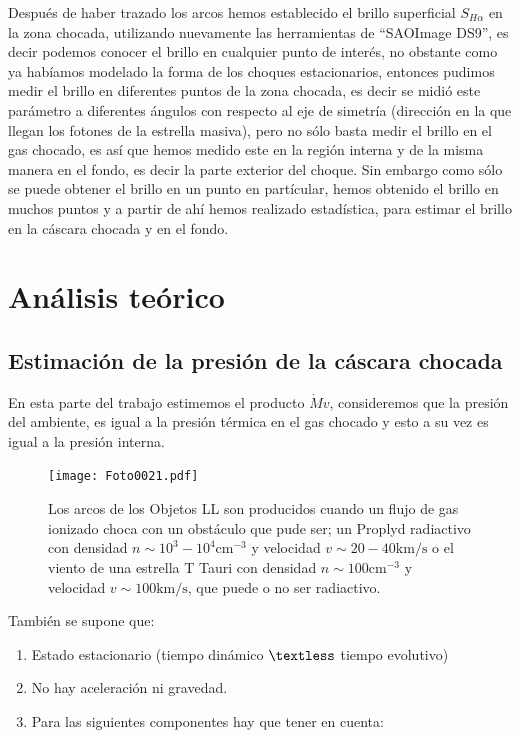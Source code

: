\documentclass{article}
\newcommand\U[1]{\ensuremath{\mathrm{#1}}}
\newcommand\cm{\U{cm}}
\begin{document}
Después de haber trazado los arcos  hemos establecido el brillo superficial \(S_{H\alpha}\) en la zona chocada, utilizando nuevamente las herramientas de ``SAOImage DS9'', es decir podemos conocer el brillo en cualquier punto de interés, no obstante como ya habíamos modelado la forma de los choques estacionarios, entonces pudimos medir el brillo en diferentes puntos de la zona chocada, es decir se midió este parámetro a diferentes ángulos con respecto al eje de simetría (dirección en la que llegan los fotones de la estrella masiva), pero no sólo basta medir el brillo en el gas chocado, es así que hemos medido este en la región interna y de la misma manera en el fondo, es decir la parte exterior del choque. Sin embargo como sólo se puede obtener el brillo en un punto en partícular, hemos obtenido el brillo en muchos puntos y a partir de ahí hemos realizado estadística, para estimar el brillo en la cáscara chocada y en el fondo.       
 
\section{Análisis teórico}
\label{sec:teoria}

\subsection{Estimación de la presión de la cáscara chocada}
\label{sec:presion}

\noindent En esta parte del trabajo estimemos el producto \(\dot{M}v\), consideremos que la presión del ambiente, es igual a la presión térmica en el gas chocado y esto a su vez es igual a la presión interna.\\

\begin{figure}
  \centering
   \texttt{[image: Foto0021.pdf]}
  \caption{Los arcos de los Objetos LL son producidos cuando un flujo de gas ionizado choca con un obstáculo que pude ser; un  Proplyd radiactivo con densidad \(n \sim 10^{3}-10^{4}\cm^{-3}\) y velocidad \(v\sim 20-40 \text{km}/\text{s}\) o el  viento de una estrella T Tauri con densidad \(n \sim 100 \cm^{-3}\) y velocidad \(v\sim 100 \text{km}/\text{s}\), que puede o no ser radiactivo.}
  \label{fig:presion-cascara}
\end{figure}

\noindent También se supone que:
\begin{enumerate}
\item  Estado estacionario (tiempo dinámico \(\textless\) tiempo evolutivo)
\item  No hay aceleración ni gravedad.
\item  Para las siguientes componentes hay que tener en cuenta:
\end{enumerate}
\end{document}
